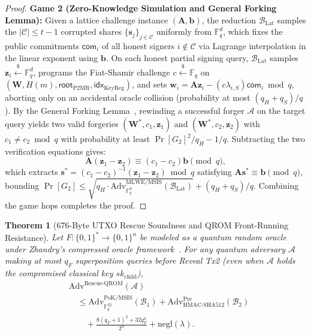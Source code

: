 \documentclass[conference,compsoc]{IEEEtran}
\newtheorem{theorem}{Theorem}
\begin{document}
\begin{proof}
\textbf{Game 2 (Zero-Knowledge Simulation and General Forking Lemma):} Given a lattice challenge instance $(\mathbf{A}, \mathbf{b})$, the reduction $\mathcal{B}_{\mathrm{Lat}}$ samples the $|\mathcal{C}| \le t - 1$ corrupted shares $\{\mathbf{s}_j\}_{j \in \mathcal{C}}$ uniformly from $\mathbb{F}_q^d$, which fixes the public commitments $\mathsf{com}_i$ of all honest signers $i \notin \mathcal{C}$ via Lagrange interpolation in the linear exponent using $\mathbf{b}$. On each honest partial signing query, $\mathcal{B}_{\mathrm{Lat}}$ samples $\mathbf{z}_i \xleftarrow{\$} \mathbb{F}_q^d$, programs the Fiat-Shamir challenge $c \xleftarrow{\$} \mathbb{F}_q$ on $(\mathbf{W}, H(m), \mathsf{root}_{\text{P2MR}}, \mathsf{idx}_{\text{KeyReg}})$, and sets $\mathbf{w}_i = \mathbf{A}\mathbf{z}_i - (c\lambda_{i,S})\mathsf{com}_i \bmod q$, aborting only on an accidental oracle collision (probability at most $(q_H + q_S)/q$). By the General Forking Lemma~\cite{bellare2006}, rewinding a successful forger $\mathcal{A}$ on the target query yields two valid forgeries $(\mathbf{W}^*, c_1, \mathbf{z}_1)$ and $(\mathbf{W}^*, c_2, \mathbf{z}_2)$ with $c_1 \ne c_2 \bmod q$ with probability at least $\Pr[G_2]^2 / q_H - 1/q$. Subtracting the two verification equations gives:
\begin{equation}
\mathbf{A}(\mathbf{z}_1 - \mathbf{z}_2) \equiv (c_1 - c_2)\mathbf{b} \pmod q,
\end{equation}
which extracts $\mathbf{s}^* = (c_1 - c_2)^{-1}(\mathbf{z}_1 - \mathbf{z}_2) \bmod q$ satisfying $\mathbf{A}\mathbf{s}^* \equiv \mathbf{b} \pmod q$, bounding $\Pr[G_2] \le \sqrt{q_H \cdot \mathrm{Adv}^{\mathrm{MLWE/MSIS}}_{\mathbb{F}_q^d}(\mathcal{B}_{\mathrm{Lat}})} + (q_H + q_S)/q$. Combining the game hops completes the proof.
\end{proof}

\begin{theorem}[676-Byte UTXO Rescue Soundness and QROM Front-Running Resistance]
\label{thm:rescue}
Let $F : \{0,1\}^* \to \{0,1\}^n$ be modeled as a quantum random oracle under Zhandry's compressed oracle framework~\cite{zhandry2019}. For any quantum adversary $\mathcal{A}$ making at most $q_F$ superposition queries before Reveal Tx2 (even when $\mathcal{A}$ holds the compromised classical key $sk_{\mathrm{child}}$),
\begin{equation}
\begin{aligned}
&\mathrm{Adv}^{\mathrm{Rescue\text{-}QROM}}(\mathcal{A}) \\
  &\quad \le \mathrm{Adv}^{\mathrm{PoK/MSIS}}_{\mathbb{F}_q^{32}}(\mathcal{B}_1)
   + \mathrm{Adv}^{\mathrm{Pre}}_{\mathrm{HMAC\text{-}SHA512}}(\mathcal{B}_2) \\
  &\qquad + \frac{8(q_F + 1)^2 + 32 q_F^3}{2^n} + \mathrm{negl}(\lambda).
\end{aligned}
\end{equation}
\end{theorem}
\end{document}
